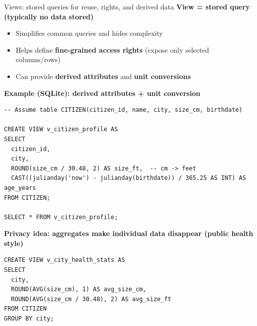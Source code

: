 \documentclass[10pt,aspectratio=169]{beamer}
\begin{document}
\begin{frame}[fragile]{Views: stored queries for reuse, rights, and derived data}
\small
\textbf{View = stored query (typically no data stored)}
\begin{itemize}
  \item Simplifies common queries and hides complexity
  \item Helps define \textbf{fine-grained access rights} (expose only selected columns/rows)
  \item Can provide \textbf{derived attributes} and \textbf{unit conversions}
\end{itemize}

\vspace{1mm}
\textbf{Example (SQLite): derived attributes + unit conversion}
\begin{lstlisting}[style=sqlite,basicstyle=\scriptsize\ttfamily]
-- Assume table CITIZEN(citizen_id, name, city, size_cm, birthdate)

CREATE VIEW v_citizen_profile AS
SELECT
  citizen_id,
  city,
  ROUND(size_cm / 30.48, 2) AS size_ft,  -- cm -> feet
  CAST((julianday('now') - julianday(birthdate)) / 365.25 AS INT) AS age_years
FROM CITIZEN;

SELECT * FROM v_citizen_profile;
\end{lstlisting}

\vspace{1mm}
\textbf{Privacy idea: aggregates make individual data disappear (public health style)}
\begin{lstlisting}[style=sqlite,basicstyle=\scriptsize\ttfamily]
CREATE VIEW v_city_health_stats AS
SELECT
  city,
  ROUND(AVG(size_cm), 1) AS avg_size_cm,
  ROUND(AVG(size_cm / 30.48), 2) AS avg_size_ft
FROM CITIZEN
GROUP BY city;
\end{lstlisting}
\end{frame}
\end{document}
